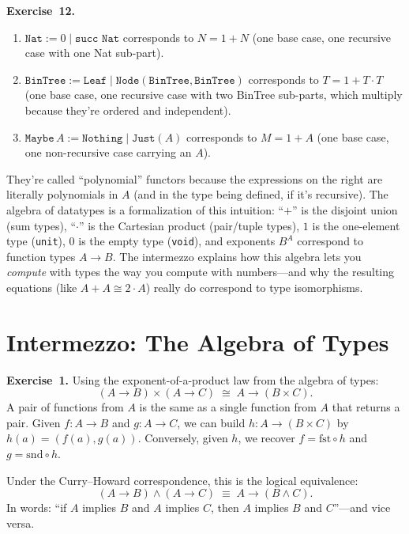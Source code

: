 \documentclass[11pt]{article}
\begin{document}
\medskip
\textbf{Exercise~12.}
\begin{enumerate}[label=(\alph*)]
  \item $\texttt{Nat} := 0 \mid \texttt{succ Nat}$ corresponds to $N = 1 + N$ (one base case, one recursive case with one Nat sub-part).
  \item $\texttt{BinTree} := \texttt{Leaf} \mid \texttt{Node}(\texttt{BinTree}, \texttt{BinTree})$ corresponds to $T = 1 + T \cdot T$ (one base case, one recursive case with two BinTree sub-parts, which multiply because they're ordered and independent).
  \item $\texttt{Maybe}\,A := \texttt{Nothing} \mid \texttt{Just}(A)$ corresponds to $M = 1 + A$ (one base case, one non-recursive case carrying an $A$).
\end{enumerate}

They're called ``polynomial'' functors because the expressions on the right are literally polynomials in $A$ (and in the type being defined, if it's recursive). The algebra of datatypes is a formalization of this intuition: ``$+$'' is the disjoint union (sum types), ``$\cdot$'' is the Cartesian product (pair/tuple types), $1$ is the one-element type (\texttt{unit}), $0$ is the empty type (\texttt{void}), and exponents $B^A$ correspond to function types $A \to B$. The intermezzo explains how this algebra lets you \emph{compute} with types the way you compute with numbers---and why the resulting equations (like $A + A \cong 2 \cdot A$) really do correspond to type isomorphisms.

\section*{Intermezzo: The Algebra of Types}

\textbf{Exercise~1.}
Using the exponent-of-a-product law from the algebra of types:
\[
  (A \to B) \times (A \to C) \;\cong\; A \to (B \times C).
\]
A pair of functions from $A$ is the same as a single function from $A$
that returns a pair.  Given $f : A \to B$ and $g : A \to C$, we can
build $h : A \to (B \times C)$ by $h(a) = (f(a), g(a))$.  Conversely,
given $h$, we recover $f = \text{fst} \circ h$ and
$g = \text{snd} \circ h$.

Under the Curry--Howard correspondence, this is the logical
equivalence:
\[
  (A \to B) \wedge (A \to C) \;\equiv\; A \to (B \wedge C).
\]
In words: ``if $A$ implies $B$ and $A$ implies $C$, then $A$ implies
$B$ and $C$''---and vice versa.
\end{document}
